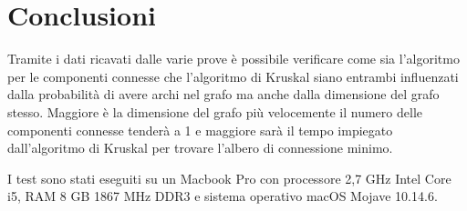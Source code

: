 \documentclass[11pt]{article}
\begin{document}
\section{Conclusioni}
Tramite i dati ricavati dalle varie prove è possibile verificare come sia l'algoritmo per le componenti connesse che l'algoritmo di Kruskal siano entrambi influenzati dalla probabilità di avere archi nel grafo ma anche dalla dimensione del grafo stesso. Maggiore è la dimensione del grafo più velocemente il numero delle componenti connesse tenderà a 1 e maggiore sarà il tempo impiegato dall'algoritmo di Kruskal per trovare l'albero di connessione minimo.

I test sono stati eseguiti su un Macbook Pro con processore 2,7 GHz Intel Core i5, RAM 8 GB 1867 MHz DDR3 e sistema operativo macOS Mojave 10.14.6.
\end{document}
